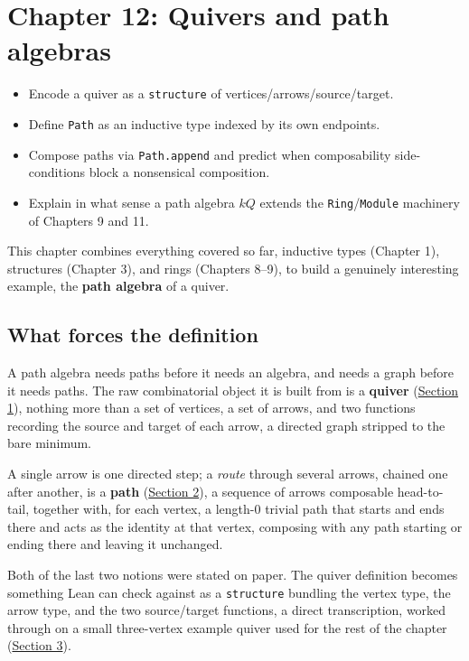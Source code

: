 \chapter{Chapter 12: Quivers and path algebras}\label{sec:12-path-algebras:00-index:1}

\begin{learningobjectives}
\begin{itemize}
\tightlist
\item
  Encode a quiver as a \texttt{structure} of vertices/arrows/source/target.
\item
  Define \texttt{Path} as an inductive type indexed by its own endpoints.
\item
  Compose paths via \texttt{Path.append} and predict when composability side-conditions block a nonsensical composition.
\item
  Explain in what sense a path algebra \(kQ\) extends the \texttt{Ring}/\texttt{Module} machinery of Chapters 9 and 11.
\end{itemize}
\end{learningobjectives}


This chapter combines everything covered so far, inductive types (Chapter 1), structures (Chapter 3), and rings (Chapters 8--9), to build a genuinely interesting example, the \textbf{path algebra} of a quiver.

\section*{What forces the definition}\label{sec:12-path-algebras:00-index:2}

A path algebra needs paths before it needs an algebra, and needs a graph before it needs paths. The raw combinatorial object it is built from is a \textbf{quiver} (\hyperref[sec:12-path-algebras:01-what-is-a-quiver:1]{Section 1}), nothing more than a set of vertices, a set of arrows, and two functions recording the source and target of each arrow, a directed graph stripped to the bare minimum.

A single arrow is one directed step; a \emph{route} through several arrows, chained one after another, is a \textbf{path} (\hyperref[sec:12-path-algebras:02-paths:1]{Section 2}), a sequence of arrows composable head-to-tail, together with, for each vertex, a length-\(0\) trivial path that starts and ends there and acts as the identity at that vertex, composing with any path starting or ending there and leaving it unchanged.

Both of the last two notions were stated on paper. The quiver definition becomes something Lean can check against as a \texttt{structure} bundling the vertex type, the arrow type, and the two source/target functions, a direct transcription, worked through on a small three-vertex example quiver used for the rest of the chapter (\hyperref[sec:12-path-algebras:03-defining-a-quiver:1]{Section 3}).

